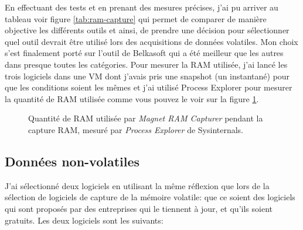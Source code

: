 En effectuant des tests et en prenant des mesures précises, j'ai pu arriver au tableau voir figure \ref{tab:ram-capture} qui permet de comparer de manière objective les différents outils et ainsi, de prendre une décision pour sélectionner quel outil devrait être utilisé lors des acquisitions de données volatiles. Mon choix s'est finalement porté sur l'outil de Belkasoft qui a été meilleur que les autres dans presque toutes les catégories. Pour mesurer la RAM utilisée, j'ai lancé les trois logiciels dans une VM dont j'avais pris une snapshot (un instantané) pour que les conditions soient les mêmes et j'ai utilisé Process Explorer pour mesurer la quantité de RAM utilisée comme vous pouvez le voir sur la figure \ref{fig:ram-used-magnet}.

\begin{figure}
    \centering
    \caption{Quantité de RAM utilisée par \textit{Magnet RAM Capturer} pendant la capture RAM, mesuré par \textit{Process Explorer} de Sysinternals.}
    \label{fig:ram-used-magnet}
\end{figure}





\subsection{Données non-volatiles}

J'ai sélectionné deux logiciels en utilisant la même réflexion que lors de la sélection de logiciels de capture de la mémoire volatile: que ce soient des logiciels qui sont proposés par des entreprises qui le tiennent à jour, et qu'ils soient gratuits. Les deux logiciels sont les suivants:

